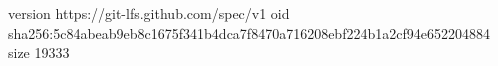 version https://git-lfs.github.com/spec/v1
oid sha256:5c84abeab9eb8c1675f341b4dca7f8470a716208ebf224b1a2cf94e652204884
size 19333

